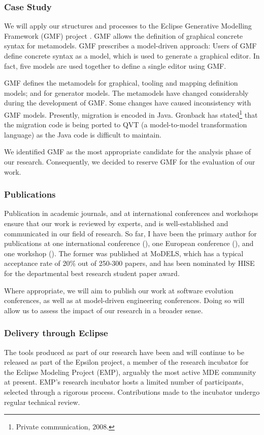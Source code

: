 \subsubsection{Case Study}
We will apply our structures and processes to the Eclipse Generative Modelling Framework (GMF) project \cite{gronback06gmf}. GMF allows the definition of graphical concrete syntax for metamodels. GMF prescribes a model-driven approach: Users of GMF define concrete syntax as a model, which is used to generate a graphical editor. In fact, five models are used together to define a single editor using GMF.

GMF defines the metamodels for graphical, tooling and mapping definition models; and for generator models. The metamodels have changed considerably during the development of GMF. Some changes have caused inconsistency with GMF models. Presently, migration is encoded in Java. Gronback has stated\footnote{Private communication, 2008.} that the migration code is being ported to QVT (a model-to-model transformation language) as the Java code is difficult to maintain.

We identified GMF as the most appropriate candidate for the analysis phase of our research. Consequently, we decided to reserve GMF for the evaluation of our work.

\subsubsection{Publications}
Publication in academic journals, and at international conferences and workshops ensure that our work is reviewed by experts, and is well-established and communicated in our field of research. So far, I have been the primary author for publications at one international conference (\cite{rose08hutn}), one European conference (\cite{rose08egl}), and one workshop (\cite{rose09patterns}). The former was published at MoDELS, which has a typical acceptance rate of 20\% out of 250-300 papers, and has been nominated by HISE for the departmental best research student paper award.

Where appropriate, we will aim to publish our work at software evolution conferences, as well as at model-driven engineering conferences. Doing so will allow us to assess the impact of our research in a broader sense.

\subsubsection{Delivery through Eclipse}
The tools produced as part of our research have been and will continue to be released as part of the Epsilon project, a member of the research incubator for the Eclipse Modeling Project (EMP), arguably the most active MDE community at present. EMP's research incubator hosts a limited number of participants, selected through a rigorous process. Contributions made to the incubator undergo regular technical review.

